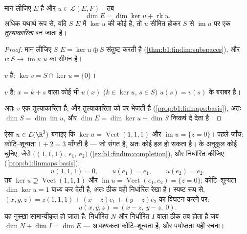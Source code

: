 \begin{theorem}[कोटि--शून्यता]\label{thm:b1:linmaps:ranknullity}
मान लीजिए $E$  है और $u \in \mathcal{L}(E, F)$।
तब
\[
\dim E = \dim \ker u + \operatorname{rk} u .
\]
अधिक यथार्थ रूप से, यदि $S$ $E$ में $\ker u$ की कोई   है, तो $u$
सीमित होकर $S$ से $\operatorname{im} u$ पर एक \emph{तुल्याकारिता} बन जाता
है।
\end{theorem}

\begin{proof}
मान लीजिए $S$ $E = \ker u \oplus S$ संतुष्ट करती है
(\cref{thm:b1:findim:subspaces}), और $v \colon S \to \operatorname{im} u$
$u$ का सीमन है।

$v$  है: $\ker v = S \cap \ker u = \{0\}$।

$v$  है: $x = k + s$ वाला कोई भी $u(x)$ ($k \in \ker u$, $s \in S$)
$u(s) = v(s)$ के बराबर है।

अतः $v$ एक तुल्याकारिता है; और तुल्याकारिता  को  पर भेजती है
(\cref{prop:b1:linmaps:basis}), अतः $\dim S = \dim\operatorname{im} u$, और
$\dim E = \dim\ker u + \dim S$ निष्कर्ष दे देता है।
\end{proof}

\begin{example}[माँग के अनुसार प्रतिचित्रण बनाना]
\label{ex:b1:linmaps:tospec}
ऐसा $u \in \mathcal{L}(\R^3)$ बनाइए कि $\ker u = \operatorname{Vect}(1,1,1)$
और $\operatorname{im} u = \{z = 0\}$। पहले जाँच: कोटि--शून्यता $1 + 2 = 3$
माँगती है --- जो संगत है, अतः कोई हल हो सकता है।  के अनुकूल कोई 
चुनिए, जैसे $\bigl((1,1,1),\ e_1,\ e_2\bigr)$
(\cref{ex:b1:findim:completion}), और  निर्धारित कीजिए
(\cref{prop:b1:linmaps:basis}):
\[
u(1,1,1) = 0, \qquad u(e_1) = e_1, \qquad u(e_2) = e_2 .
\]
तब $\ker u \supseteq \operatorname{Vect}(1,1,1)$ और $\operatorname{im} u =
\operatorname{Vect}(e_1, e_2) = \{z = 0\}$; कोटि--शून्यता $\dim\ker u = 1$
बाध्य कर देती है, अतः  ठीक वही निर्धारित रेखा है। स्पष्ट रूप से, $(x,
y, z) = z(1,1,1) + (x - z)e_1 + (y - z)e_2$ का विघटन करने पर:
\[
u(x, y, z) = (x - z,\ y - z,\ 0).
\]
यह नुस्ख़ा सामान्यीकृत हो जाता है: निर्धारित  $N$ और निर्धारित
 $I$ वाला  ठीक तब होता है जब $\dim N + \dim I =
\dim E$ --- आवश्यकता कोटि--शून्यता है, और पर्याप्तता यही रचना।
\end{example}

